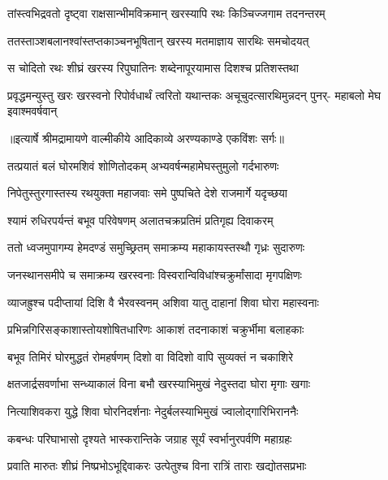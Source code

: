 \twolineshloka
{तांस्त्वभिद्रवतो दृष्ट्वा राक्षसान्भीमविक्रमान्}
{खरस्यापि रथः किञ्चिज्जगाम तदनन्तरम्} %

\twolineshloka
{ततस्ताञ्शबलानश्वांस्तप्तकाञ्चनभूषितान्}
{खरस्य मतमाज्ञाय सारथिः समचोदयत्} %

\twolineshloka
{स चोदितो रथः शीघ्रं खरस्य रिपुघातिनः}
{शब्देनापूरयामास दिशश्च प्रतिशस्तथा} %

\fourlineindentedshloka
{प्रवृद्धमन्युस्तु खरः खरस्वनो}
{रिपोर्वधार्थं त्वरितो यथान्तकः}
{अचूचुदत्सारथिमुन्नदन् पुनर्-}
{महाबलो मेघ इवाश्मवर्षवान्} %


{॥इत्यार्षे श्रीमद्रामायणे वाल्मीकीये आदिकाव्ये अरण्यकाण्डे एकविंशः सर्गः॥}


\twolineshloka
{तत्प्रयातं बलं घोरमशिवं शोणितोदकम्}
{अभ्यवर्षन्महामेघस्तुमुलो गर्दभारुणः} %

\twolineshloka
{निपेतुस्तुरगास्तस्य रथयुक्ता महाजवाः}
{समे पुष्पचिते देशे राजमार्गे यदृच्छया} %

\twolineshloka
{श्यामं रुधिरपर्यन्तं बभूव परिवेषणम्}
{अलातचक्रप्रतिमं प्रतिगृह्य दिवाकरम्} %

\twolineshloka
{ततो ध्वजमुपागम्य हेमदण्डं समुच्छ्रितम्}
{समाक्रम्य महाकायस्तस्थौ गृध्रः सुदारुणः} %

\twolineshloka
{जनस्थानसमीपे च समाक्रम्य खरस्वनाः}
{विस्वरान्विविधांश्चक्रुर्मांसादा मृगपक्षिणः} %

\twolineshloka
{व्याजह्रुश्च पदीप्तायां दिशि वै भैरवस्वनम्}
{अशिवा यातु दाहानां शिवा घोरा महास्वनाः} %

\twolineshloka
{प्रभिन्नगिरिसङ्काशास्तोयशोषितधारिणः}
{आकाशं तदनाकाशं चक्रुर्भीमा बलाहकाः} %

\twolineshloka
{बभूव तिमिरं घोरमुद्धतं रोमहर्षणम्}
{दिशो वा विदिशो वापि सुव्यक्तं न चकाशिरे} %

\twolineshloka
{क्षतजार्द्रसवर्णाभा सन्ध्याकालं विना बभौ}
{खरस्याभिमुखं नेदुस्तदा घोरा मृगाः खगाः} %

\twolineshloka
{नित्याशिवकरा युद्धे शिवा घोरनिदर्शनाः}
{नेदुर्बलस्याभिमुखं ज्वालोद्गारिभिराननैः} %

\twolineshloka
{कबन्धः परिघाभासो दृश्यते भास्करान्तिके}
{जग्राह सूर्यं स्वर्भानुरपर्वणि महाग्रहः} %

\twolineshloka
{प्रवाति मारुतः शीघ्रं निष्प्रभोऽभूद्दिवाकरः}
{उत्पेतुश्च विना रात्रिं ताराः खद्योतसप्रभाः} %

